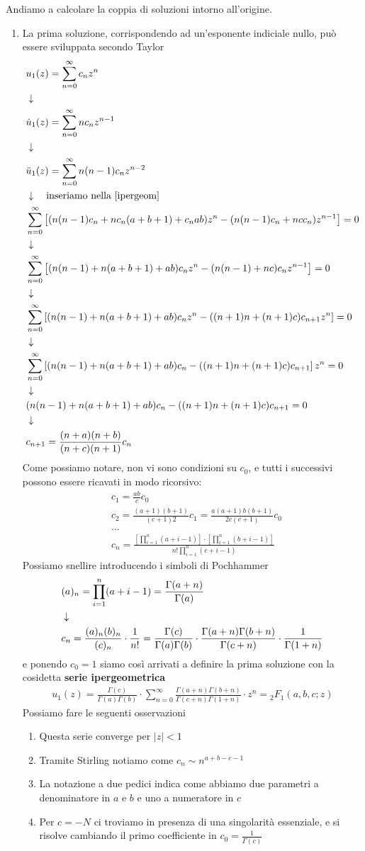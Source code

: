 Andiamo a calcolare la coppia di soluzioni intorno all'origine. 
\begin{enumerate}
	\item La prima soluzione, corrispondendo ad un'esponente indiciale nullo, può essere sviluppata secondo Taylor
	\begin{align}
		&u_1(z) 	   = \sum_{n=0}^{\infty} c_n z^n\\ &\downarrow \nonumber \\
		&\dot{u}_1(z)  = \sum_{n=0}^{\infty} nc_n z^{n-1}\\ &\downarrow \nonumber \\
		&\ddot{u}_1(z) = \sum_{n=0}^{\infty} n(n-1)c_n z^{n-2}\\ &\downarrow \quad \text{inseriamo nella \ref{ipergeom}} \nonumber \\
		&\sum_{n=0}^{\infty}\left[ (n(n-1) c_n + nc_n(a+b+1) + c_n ab) z^n - (n(n-1)c_n + ncc_n)z^{n-1}  \right] = 0\\ &\downarrow \nonumber \\
		&\sum_{n=0}^{\infty}\left[ (n(n-1) + n(a+b+1) + ab)c_n z^n - (n(n-1) + nc)c_nz^{n-1}  \right] = 0\\ &\downarrow \nonumber \\
		&\sum_{n=0}^{\infty}\left[ (n(n-1) + n(a+b+1) + ab)c_n z^n - ((n+1)n + (n+1)c)c_{n+1}z^{n}  \right] = 0\nonumber \\ &\downarrow \nonumber \\
		&\sum_{n=0}^{\infty}\left[ (n(n-1) + n(a+b+1) + ab)c_n - ((n+1)n + (n+1)c)c_{n+1}\right]z^n = 0\nonumber \\ &\downarrow \nonumber \\
		&(n(n-1) + n(a+b+1) + ab)c_n - ((n+1)n + (n+1)c)c_{n+1} = 0\nonumber \\ &\downarrow \nonumber \\
		&c_{n+1} = \frac{(n+a)(n+b)}{(n+c)(n+1)}c_n
	\end{align}
	\newpage
	Come possiamo notare, non vi sono condizioni su $c_0$, e tutti i successivi possono essere ricavati in modo ricorsivo:
	\begin{align}
		&c_1 = \frac{ab}{c}c_0\\
		&c_2 = \frac{(a+1)(b+1)}{(c+1)2}c_1 = \frac{a(a+1)b(b+1)}{2c(c+1)}c_0\\
		&\dots\nonumber\\
		&c_n = \frac{\left[\prod_{i=1}^{n}(a+i-1)\right] \cdot \left[\prod_{i=1}^{n}(b+i-1)\right]  }{n! \prod_{i=1}^{n}(c+i-1) }
	\end{align}
	Possiamo snellire introducendo i simboli di Pochhammer
	\begin{align}
		&(a)_n = \prod_{i=1}^{n}(a+i-1) = \frac{\Gamma(a+n)}{\Gamma(a)}\\ &\downarrow \nonumber \\
		&c_n = \frac{(a)_n (b)_n}{(c)_n} \cdot \frac{1}{n!} = \frac{\Gamma(c)}{\Gamma(a)\Gamma(b)} \cdot \frac{\Gamma(a+n)\Gamma(b+n)}{\Gamma(c+n)} \cdot \frac{1}{\Gamma(1+n)}
	\end{align}
	e ponendo $c_0=1$ siamo così arrivati a definire la prima soluzione con la cosidetta \textbf{serie ipergeometrica}
	\begin{align}
		u_1(z) = \frac{\Gamma(c)}{\Gamma(a)\Gamma(b)} \cdot \sum_{n=0}^{\infty} \frac{\Gamma(a+n)\Gamma(b+n)}{\Gamma(c+n)\Gamma(1+n)} \cdot z^n = {}_2F_1(a,b,c;z)
	\end{align}
	Possiamo fare le seguenti osservazioni
	\begin{enumerate}
		\item Questa serie converge per $|z|<1$
		\item Tramite Stirling notiamo come $c_n \sim n^{a+b-c-1}$
		\item La notazione a due pedici indica come abbiamo due parametri a denominatore in $a$ e $b$ e uno a numeratore in $c$
		\item Per $c=-N$ ci troviamo in presenza di una singolarità essenziale, e si risolve cambiando il primo coefficiente in $c_0 = \frac{1}{\Gamma(c)}$ 
	\end{enumerate}
	

\end{enumerate}
